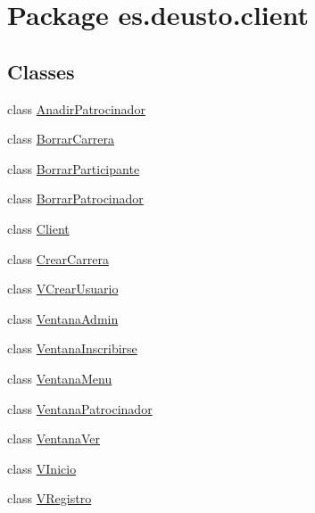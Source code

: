 \hypertarget{namespacees_1_1deusto_1_1client}{}\section{Package es.\+deusto.\+client}
\label{namespacees_1_1deusto_1_1client}
\subsection*{Classes}
\begin{DoxyCompactItemize}
\item 
class \mbox{\hyperlink{classes_1_1deusto_1_1client_1_1_anadir_patrocinador}{Anadir\+Patrocinador}}
\item 
class \mbox{\hyperlink{classes_1_1deusto_1_1client_1_1_borrar_carrera}{Borrar\+Carrera}}
\item 
class \mbox{\hyperlink{classes_1_1deusto_1_1client_1_1_borrar_participante}{Borrar\+Participante}}
\item 
class \mbox{\hyperlink{classes_1_1deusto_1_1client_1_1_borrar_patrocinador}{Borrar\+Patrocinador}}
\item 
class \mbox{\hyperlink{classes_1_1deusto_1_1client_1_1_client}{Client}}
\item 
class \mbox{\hyperlink{classes_1_1deusto_1_1client_1_1_crear_carrera}{Crear\+Carrera}}
\item 
class \mbox{\hyperlink{classes_1_1deusto_1_1client_1_1_v_crear_usuario}{V\+Crear\+Usuario}}
\item 
class \mbox{\hyperlink{classes_1_1deusto_1_1client_1_1_ventana_admin}{Ventana\+Admin}}
\item 
class \mbox{\hyperlink{classes_1_1deusto_1_1client_1_1_ventana_inscribirse}{Ventana\+Inscribirse}}
\item 
class \mbox{\hyperlink{classes_1_1deusto_1_1client_1_1_ventana_menu}{Ventana\+Menu}}
\item 
class \mbox{\hyperlink{classes_1_1deusto_1_1client_1_1_ventana_patrocinador}{Ventana\+Patrocinador}}
\item 
class \mbox{\hyperlink{classes_1_1deusto_1_1client_1_1_ventana_ver}{Ventana\+Ver}}
\item 
class \mbox{\hyperlink{classes_1_1deusto_1_1client_1_1_v_inicio}{V\+Inicio}}
\item 
class \mbox{\hyperlink{classes_1_1deusto_1_1client_1_1_v_registro}{V\+Registro}}
\end{DoxyCompactItemize}
